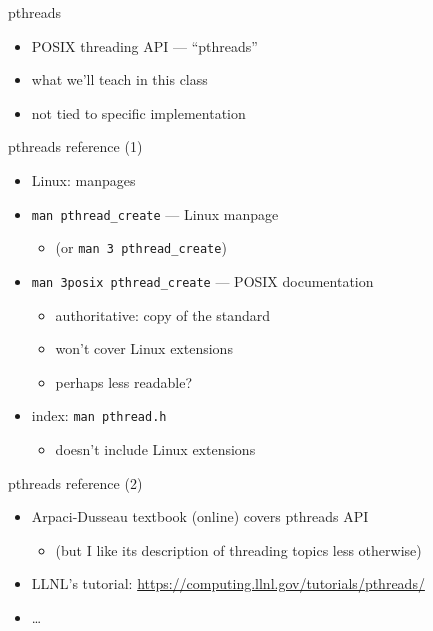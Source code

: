 \begin{frame}{pthreads}
\begin{itemize}
\item POSIX threading API --- ``pthreads''
\item what we'll teach in this class
\vspace{.5cm}
\item not tied to specific implementation
\end{itemize}
\end{frame}

\begin{frame}{pthreads reference (1)}
\begin{itemize}
\item Linux: manpages
\item \texttt{man pthread\_create} --- Linux manpage
    \begin{itemize}
    \item (or \texttt{man 3 pthread\_create})
    \end{itemize}
\item \texttt{man 3posix pthread\_create} --- POSIX documentation
    \begin{itemize}
    \item authoritative: copy of the standard
    \item won't cover Linux extensions
    \item perhaps less readable?
    \end{itemize}
\vspace{.5cm}
\item index: \texttt{man pthread.h}
    \begin{itemize}
    \item doesn't include Linux extensions
    \end{itemize}
\end{itemize}
\end{frame}

\begin{frame}{pthreads reference (2)}
\begin{itemize}
\item Arpaci-Dusseau textbook (online) covers pthreads API
    \begin{itemize}
    \item (but I like its description of threading topics less otherwise)
    \end{itemize}
\item LLNL's tutorial: \url{https://computing.llnl.gov/tutorials/pthreads/}
\item \ldots
\end{itemize}
\end{frame}

